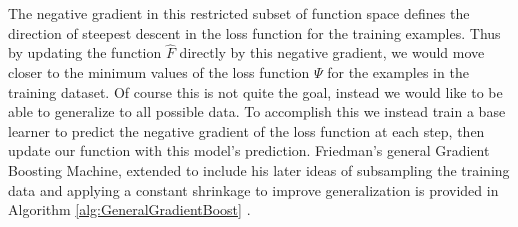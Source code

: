 \documentclass[9pt, conference]{IEEEtran}
\begin{document}
The negative gradient in this restricted subset of function space defines the direction of steepest descent in the loss function for the training examples. Thus by updating the function \(\hat{F}\) directly by this negative gradient, we would move closer to the minimum values of the loss function \(\Psi\) for the examples in the training dataset. Of course this is not quite the goal, instead we would like to be able to generalize to all possible data. To accomplish this we instead train a base learner to predict the negative gradient of the loss function at each step, then update our function with this model's prediction. Friedman's general Gradient Boosting Machine, extended to include his later ideas of subsampling the training data and applying a constant shrinkage to improve generalization is provided in Algorithm \ref{alg:GeneralGradientBoost} \cite{2012ridgeway} \cite{2001Friedman} \cite{2002Friedman}. 
\end{document}
